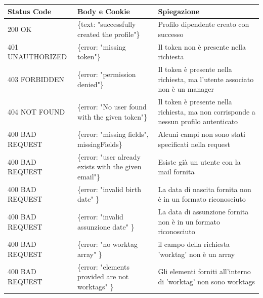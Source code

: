 \documentclass{report}
\begin{document}
\begin{center} %
	\centering
	\begin{tabular}{ |p{4cm}|p{5cm}|p{4cm}| }
		\hline
		\centering Status Code & \qquad\quad Body e Cookie                             & \qquad\qquad Spiegazione                                                             \\ %
		\hline
		200 OK                 & \{text: "successfully created the profile"\}          & Profilo dipendente creato con successo                                               \\
		\hline
		401 UNAUTHORIZED       & \{error: "missing token"\}                            & Il token non è presente nella richiesta                                              \\
		\hline
		403 FORBIDDEN          & \{error: "permission denied"\}                        & Il token è presente nella richiesta, ma l'utente associato non è un manager          \\
		\hline
		404 NOT FOUND          & \{error: "No user found with the given token"\}       & Il token è presente nella richiesta, ma non corrisponde a nessun profilo autenticato \\
		\hline
		400 BAD REQUEST        & \{error: "missing fields", missingFields\}            & Alcuni campi non sono stati specificati nella request                                \\ %
		\hline
		400 BAD REQUEST        & \{error: "user already exists with the given email"\} & Esiste già un utente con la mail fornita                                             \\%
		\hline
		400 BAD REQUEST        & \{error: "invalid birth date" \}                      & La data di nascita fornita non è in un formato riconosciuto                          \\
		\hline
		400 BAD REQUEST        & \{error: "invalid assunzione date" \}                 & La data di assunzione fornita non è in un formato riconosciuto                       \\
		\hline
		400 BAD REQUEST        & \{error: "no worktag array" \}                        & il campo della richiesta 'worktag' non è un array                                    \\
		\hline
		400 BAD REQUEST        & \{error: "elements provided are not worktags" \}      & Gli elementi forniti all'interno di 'worktag' non sono worktags                      \\
		\hline
	\end{tabular}
\end{center}
\end{document}
